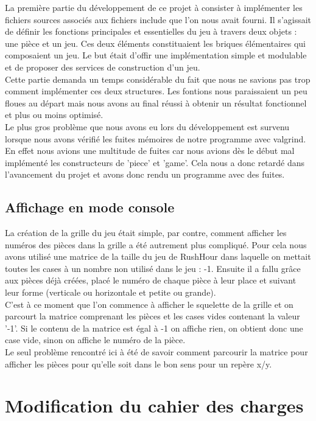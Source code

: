 \documentclass[20pt]{article}
\begin{document}
La première partie du développement de ce projet à consister à implémenter les fichiers sources associés aux fichiers include que l'on nous avait fourni. Il s'agissait de définir les fonctions principales et essentielles du jeu à travers deux objets : une pièce et un jeu. Ces deux éléments constituaient les briques élémentaires qui composaient un jeu. Le but était d'offir une implémentation simple et modulable et de proposer des services de construction d'un jeu.\\
Cette partie demanda un temps considérable du fait que nous ne savions pas trop comment implémenter ces deux structures. Les fontions nous paraissaient un peu floues au départ mais nous avons au final réussi à obtenir un résultat fonctionnel et plus ou moins optimisé.\\
Le plus gros problème que nous avons eu lors du développement est survenu lorsque nous avons vérifié les fuites mémoires de notre programme avec valgrind. En effet nous avions une multitude de fuites car nous avions dès le début mal implémenté les constructeurs de 'piece' et 'game'. Cela nous a donc retardé dans l'avancement du projet et avons donc rendu un programme avec des fuites.

\subsection{Affichage en mode console}

La création de la grille du jeu était simple, par contre, comment afficher les numéros des pièces dans la grille a été autrement plus compliqué. Pour cela nous avons utilisé une matrice de la taille du jeu de RushHour dans laquelle on mettait toutes les cases à un nombre non utilisé dans le jeu : -1. Ensuite il a fallu grâce aux pièces déjà créées, placé le numéro de chaque pièce à leur place et suivant leur forme (verticale ou horizontale et petite ou grande).\\
C'est à ce moment que l'on commence à afficher le squelette de la grille et on parcourt la matrice comprenant les pièces et les cases vides contenant la valeur '-1'. Si le contenu de la matrice est égal à -1 on affiche rien, on obtient donc une case vide, sinon on affiche le numéro de la pièce.\\

Le seul problème rencontré ici à été de savoir comment parcourir la matrice pour afficher les pièces pour qu'elle soit dans le bon sens pour un repère x/y.


\section{Modification du cahier des charges}
\end{document}
